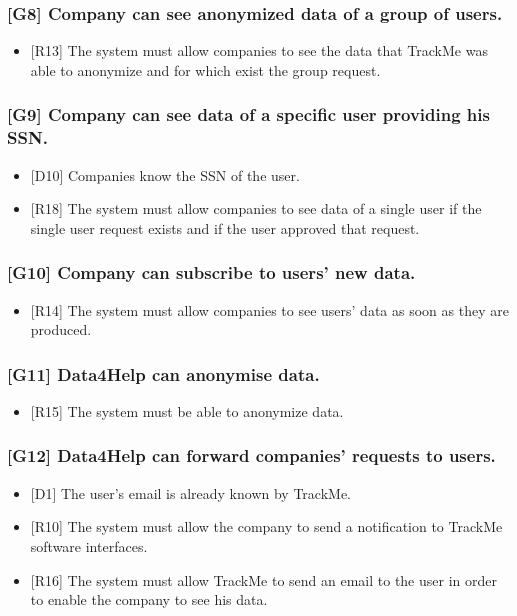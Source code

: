 \documentclass{article}
\begin{document}
\subsubsection{[G8] Company can see anonymized data of a group of users.}
\begin{itemize}
\item {[R13]} The system must allow companies to see the data that TrackMe was able to anonymize and for which exist the group request.
\end{itemize}
\subsubsection{[G9] Company can see data of a specific user providing his SSN.}
\begin{itemize}
\item {[D10]} Companies know the SSN of the user.
\item {[R18]} The system must allow companies to see data of a single user if the single user request exists and if the user approved that request.
\end{itemize}
\subsubsection{[G10] Company can subscribe to users’ new data.}
\begin{itemize}
\item {[R14]} The system must allow companies to see users' data as soon as they are produced.
\end{itemize}
\subsubsection{[G11] Data4Help can anonymise data.}
\begin{itemize}
\item {[R15]} The system must be able to anonymize data.
\end{itemize}
\subsubsection{[G12] Data4Help can forward companies’ requests to users.}
\begin{itemize}
\item {[D1]} The user’s email is already known by TrackMe.
\item {[R10]} The system must allow the company to send a notification to TrackMe software interfaces.
\item {[R16]} The system must allow TrackMe to send an email to the user in order to enable the company to see his data.
\end{itemize}
\end{document}
